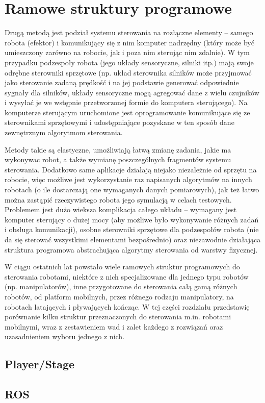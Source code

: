 \section{Ramowe struktury programowe}

Drugą metodą jest podział systemu sterowania na rozłączne elementy -- samego
robota (efektor) i komunikujący się z nim komputer nadrzędny (który może być umieszczony
zarówno na robocie, jak i poza nim sterując nim zdalnie). W tym przypadku podzespoły
robota (jego układy sensoryczne, silniki itp.) mają swoje odrębne sterowniki sprzętowe
(np. układ sterownika silników może przyjmować jako sterowanie zadaną prędkość
i na jej podstawie generować odpowiednie sygnały dla silników, układy sensoryczne
mogą agregować dane z wielu czujników i wysyłać je we wstępnie przetworzonej formie
do komputera sterującego). Na komputerze sterującym uruchomione jest oprogramowanie
komunikujące się ze sterownikami sprzętowymi i udostępniające pozyskane w ten sposób
dane zewnętrznym algorytmom sterowania.

Metody takie są elastyczne, umożliwiają łatwą zmianę zadania, jakie ma wykonywac robot,
a także wymianę poszczególnych fragmentów systemu sterowania. Dodatkowo same aplikacje
działają niejako niezależnie od sprzętu na robocie, więc możliwe jest wykorzystanie
raz napisanych algorytmów na innych robotach (o ile dostarczają one wymaganych danych
pomiarowych), jak też łatwo można zastąpić rzeczywistego robota jego symulacją w celach
testowych. Problemem jest dużo wieksza komplikacja całego układu -- wymagany jest
komputer sterujący o dużej mocy (aby możliwe było wykonywanie różnych zadań i obsługa
komunikacji), osobne sterowniki sprzętowe dla podzespołów robota (nie da się sterować
wszystkimi elementami bezpośrednio) oraz niezawodnie działająca struktura programowa
abstrachująca algorytmy sterowania od warstwy fizycznej.

W ciągu ostatnich lat powstało wiele ramowych struktur programowych do sterowania
robotami, niektóre z nich specjalizowane dla jednego typu robotów (np. manipulatorów),
inne przygotowane do sterowania całą gamą różnych robotów, od platform mobilnych,
przez różnego rodzaju manipulatory, na robotach latających i pływających kończąc.
W tej części rozdziału przedstawię porównanie kilku struktur przeznaczonych do
sterowania m.in. robotami mobilnymi, wraz z zestawieniem wad i zalet każdego z rozwiązań
oraz uzasadnieniem wyboru jednego z nich.


\subsection{Player/Stage}

\cite{gerkey03playerstage}

\subsection{ROS}

\cite{288}

